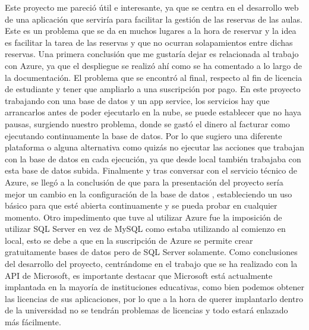 
Este proyecto me pareció útil e interesante, ya que se centra en el desarrollo web de una aplicación que serviría para facilitar la gestión de las reservas de las aulas. Este es un problema que se da en muchos lugares a la hora de reservar y la idea es facilitar la tarea de las reservas y que no ocurran solapamientos entre dichas reservas.
\newline
Una primera conclusión que me gustaría dejar es relacionada al trabajo con Azure, ya que el despliegue se realizó ahí como se ha comentado a lo largo de la documentación. El problema que se encontró al final, respecto al fin de licencia de estudiante y tener que ampliarlo a una suscripción por pago. En este proyecto trabajando con una base de datos y un app service, los servicios hay que arrancarlos antes de poder ejecutarlo en la nube, se puede establecer que no haya pausas, surgiendo nuestro problema, donde se gastó el dinero al facturar como ejecutando continuamente la base de datos. Por lo que sugiero una diferente plataforma o alguna alternativa como quizás no ejecutar las acciones que trabajan con la base de datos en cada ejecución, ya que desde local también trabajaba con esta base de datos subida. Finalmente y tras conversar con el servicio técnico de Azure, se llegó a la conclusión de que para la presentación del proyecto sería mejor un cambio en la configuración de la base de datos , estableciendo un uso básico para que esté abierta continuamente y se pueda probar en cualquier momento.\newline 
Otro impedimento que tuve al utilizar Azure fue la imposición de utilizar SQL Server en vez de MySQL como estaba utilizando al comienzo en local, esto se debe a que en la suscripción de Azure se permite crear gratuitamente bases de datos pero de SQL Server solamente.\newline
Como conclusiones del desarrollo del proyecto, centrándome en el trabajo que se ha realizado con la API de Microsoft, es importante destacar que Microsoft está actualmente implantada en la mayoría de instituciones educativas, como bien podemos obtener las licencias de sus aplicaciones, por lo que a la hora de querer implantarlo dentro de la universidad no se tendrán problemas de licencias y todo estará enlazado más fácilmente.\newline
